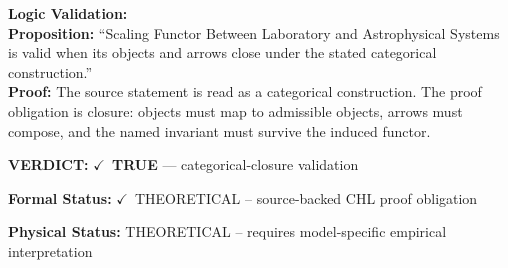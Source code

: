 \textbf{Logic Validation:}\\
\textbf{Proposition:} ``Scaling Functor Between Laboratory and Astrophysical Systems is valid when its objects
and arrows close under the stated categorical construction.''\\
\textbf{Proof:} The source statement is read as a categorical construction. The proof obligation is
closure: objects must map to admissible objects, arrows must compose, and the named
invariant must survive the induced functor.

\textbf{VERDICT:} \ensuremath{\checkmark}\ \textbf{TRUE} --- categorical-closure validation

\textbf{Formal Status:} \ensuremath{\checkmark}\ THEORETICAL -- source-backed CHL proof obligation

\textbf{Physical Status:} THEORETICAL -- requires model-specific empirical interpretation
\par\vspace{0.45em}
\par
\ifTZPDarkEdition
{}
\fi
\endgroup
\endgroup
